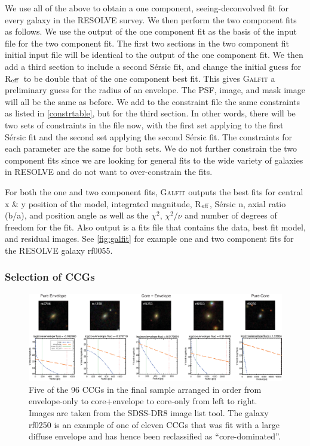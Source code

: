 \documentclass[iop,apj]{emulateapj}
\newcommand{\Reff}{R$_{\rm eff}$}
\begin{document}
  We use all of the above to obtain a one component, seeing-deconvolved fit for every galaxy in the RESOLVE survey. We then perform the two component fits as follows. We use the output of the one component fit as the basis of the input file for the two component fit. The first two sections in the two component fit initial input file will be identical to the output of the one component fit. We then add a third section to include a second S\'ersic fit, and change the initial guess for \Reff\ to be double that of the one component best fit. This gives \textsc{Galfit} a preliminary guess for the radius of an envelope. The PSF, image, and mask image will all be the same as before. We add to the constraint file the same constraints as listed in \autoref{constrtable}, but for the third section. In other words, there will be two sets of constraints in the file now, with the first set applying to the first S\'ersic fit and the second set applying the second S\'ersic fit. The constraints for each parameter are the same for both sets. We do not further constrain the two component fits since we are looking for general fits to the wide variety of galaxies in RESOLVE and do not want to over-constrain the fits.

For both the one and two component fits, \textsc{Galfit} outputs the best fits for central x \& y position of the model, integrated magnitude, \Reff, S\'ersic n, axial ratio (b/a), and position angle as well as the $\chi^2$, $\chi^2/\nu$ and number of degrees of freedom for the fit. Also output is a fits file that contains the data, best fit model, and residual images. See \autoref{fig:galfit} for example one and two component fits for the RESOLVE galaxy rf0055.

\subsubsection{Selection of CCGs}
\label{CCGs}

\begin{figure}[hbpt!]
\begin{center}
\includegraphics[scale=0.65]{coretoenvelopeims.eps}
\caption{Five of the 96 CCGs in the final sample arranged in order from envelope-only to core+envelope to core-only from left to right. Images are taken from the SDSS-DR8 image list tool. The galaxy rf0250 is an example of one of eleven CCGs that was fit with a large diffuse envelope and has hence been reclassified as ``core-dominated''.}
\label{fig:pics}
\end{center}
\end{figure}
\end{document}
